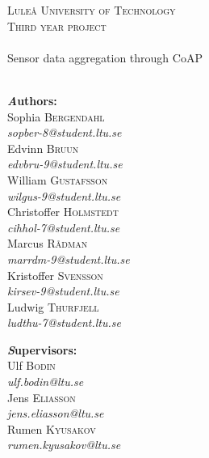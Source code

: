 %
\begin{titlepage}
\begin{center}

\textsc{\LARGE Luleå University of Technology}\\[0.5cm]
\textsc{\Large Third year project}\\[0.5cm]

\HRule \\[0.4cm]
{\huge Sensor data aggregation through CoAP}\\[0.2cm]

\HRule \\[1.5cm]

\begin{minipage}[t]{0.5\textwidth}
\begin{flushleft} \large
{\bfseries \emph Authors:}\\
Sophia \textsc{Bergendahl}\\
\emph{sopber-8@student.ltu.se}\\[0.2cm]
Edvinn \textsc{Bruun}\\
\emph{edvbru-9@student.ltu.se}\\[0.2cm]
William \textsc{Gustafsson}\\
\emph{wilgus-9@student.ltu.se}\\[0.2cm]
Christoffer \textsc{Holmstedt}\\
\emph{cihhol-7@student.ltu.se}\\[0.2cm]
Marcus \textsc{Rådman}\\
\emph{marrdm-9@student.ltu.se}\\[0.2cm]
Kristoffer \textsc{Svensson}\\
\emph{kirsev-9@student.ltu.se}\\[0.2cm]
Ludwig \textsc{Thurfjell}\\
\emph{ludthu-7@student.ltu.se}\\
\end{flushleft}
\end{minipage}
\begin{minipage}[t]{0.45\textwidth}
\begin{flushright} \large
{\bfseries \emph Supervisors:} \\
Ulf \textsc{Bodin}\\
\emph{ulf.bodin@ltu.se}\\[0.2cm]
Jens \textsc{Eliasson}\\
\emph{jens.eliasson@ltu.se}\\[0.2cm]
Rumen \textsc{Kyusakov}\\
\emph{rumen.kyusakov@ltu.se}\\[0.2cm]
\end{flushright}
\end{minipage}


\end{center}
\end{titlepage}
